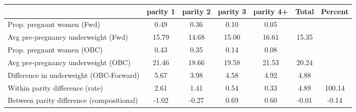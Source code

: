 \begin{tabular}{l*{6}{c}}
\toprule
            &\multicolumn{1}{c}{parity 1}&\multicolumn{1}{c}{parity 2}&\multicolumn{1}{c}{parity 3}&\multicolumn{1}{c}{parity 4+}&\multicolumn{1}{c}{Total}&\multicolumn{1}{c}{Percent}\\
\midrule
\midrule
Prop. pregnant women (Fwd)&        0.49&        0.36&        0.10&        0.05&            &            \\
Avg pre-pregnancy underweight (Fwd)&       15.79&       14.68&       15.00&       16.61&       15.35&            \\
Prop. pregnant women (OBC)&        0.43&        0.35&        0.14&        0.08&            &            \\
Avg pre-pregnancy underweight (OBC)&       21.46&       18.66&       19.58&       21.53&       20.24&            \\
Difference in underweight (OBC-Forward)&        5.67&        3.98&        4.58&        4.92&        4.88&            \\
Within parity difference (rate)&        2.61&        1.41&        0.54&        0.33&        4.89&      100.14\\
Between parity difference (compositional)&       -1.02&       -0.27&        0.69&        0.60&       -0.01&       -0.14\\
\bottomrule
\end{tabular}
